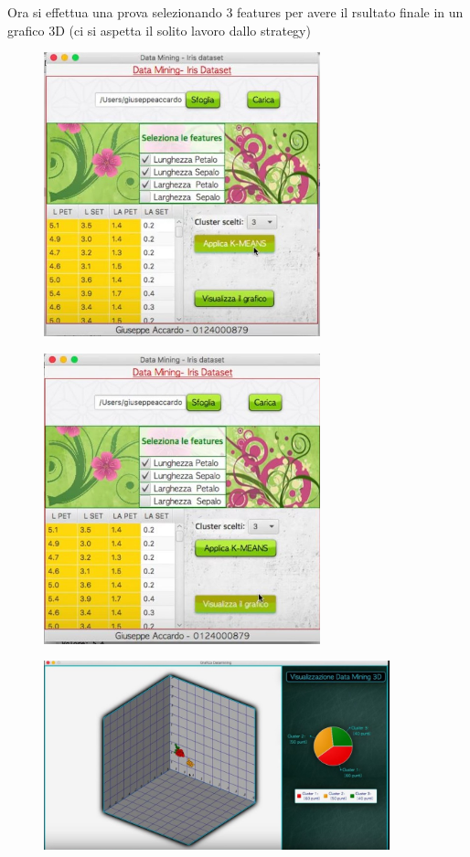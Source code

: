 \documentclass[a4paper, oneside]{book}
\begin{document}
\newpage
Ora si effettua una prova selezionando 3 features per avere il rsultato finale in un grafico 3D (ci si aspetta il solito lavoro dallo strategy) 
\begin{figure}[htp]
\centering
\includegraphics[width=8cm]{14.bmp}
\end{figure}
\begin{figure}[htp]
\centering
\includegraphics[width=8cm]{16.bmp}
\end{figure}
\begin{figure}[htp]
\centering
\includegraphics[width=10cm]{18.bmp}
\end{figure}
\end{document}
